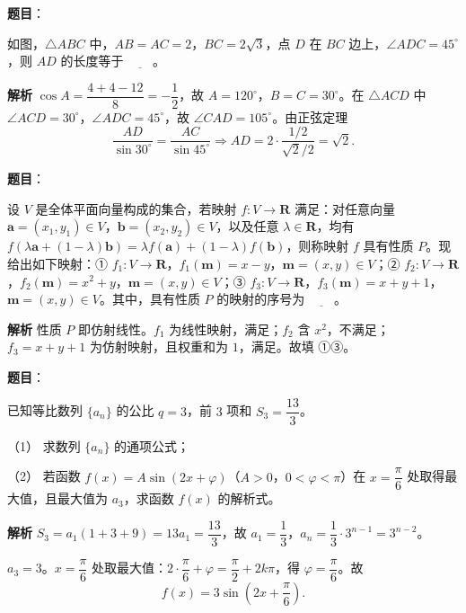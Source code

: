 \begin{answer}

\textbf{题目}：

如图，$\triangle ABC$ 中，$AB=AC=2$，$BC=2\sqrt3$，点 $D$ 在 $BC$ 边上，$\angle ADC=45^\circ$，则 $AD$ 的长度等于 $\underline{\qquad}$。
\nopagebreak[4]
\begin{center}\end{center}
\nopagebreak[4]
\textbf{解析}
$\cos A=\dfrac{4+4-12}{8}=-\dfrac12$，故 $A=120^\circ$，$B=C=30^\circ$。在 $\triangle ACD$ 中 $\angle ACD=30^\circ$，$\angle ADC=45^\circ$，故 $\angle CAD=105^\circ$。由正弦定理
\nopagebreak[4]
\[\frac{AD}{\sin30^\circ}=\frac{AC}{\sin45^\circ}\Longrightarrow AD=2\cdot\frac{1/2}{\sqrt2/2}=\sqrt2.\]


\end{answer}
\begin{answer}

\textbf{题目}：

设 $V$ 是全体平面向量构成的集合，若映射 $f:V\to\mathbf R$ 满足：对任意向量 $\boldsymbol a=(x_1,y_1)\in V$，$\boldsymbol b=(x_2,y_2)\in V$，以及任意 $\lambda\in\mathbf R$，均有 $f(\lambda\boldsymbol a+(1-\lambda)\boldsymbol b)=\lambda f(\boldsymbol a)+(1-\lambda)f(\boldsymbol b)$，则称映射 $f$ 具有性质 $P$。现给出如下映射：① $f_1:V\to\mathbf R$，$f_1(\boldsymbol m)=x-y$，$\boldsymbol m=(x,y)\in V$；② $f_2:V\to\mathbf R$，$f_2(\boldsymbol m)=x^2+y$，$\boldsymbol m=(x,y)\in V$；③ $f_3:V\to\mathbf R$，$f_3(\boldsymbol m)=x+y+1$，$\boldsymbol m=(x,y)\in V$。其中，具有性质 $P$ 的映射的序号为 $\underline{\qquad}$。

\textbf{解析}
性质 $P$ 即仿射线性。$f_1$ 为线性映射，满足；$f_2$ 含 $x^2$，不满足；$f_3=x+y+1$ 为仿射映射，且权重和为 $1$，满足。故填 ①③。


\end{answer}
\begin{answer}

\textbf{题目}：

已知等比数列 $\{a_n\}$ 的公比 $q=3$，前 $3$ 项和 $S_3=\dfrac{13}3$。

（1） 求数列 $\{a_n\}$ 的通项公式；

（2） 若函数 $f(x)=A\sin(2x+\varphi)$（$A>0$，$0<\varphi<\pi$）在 $x=\dfrac\pi6$ 处取得最大值，且最大值为 $a_3$，求函数 $f(x)$ 的解析式。

\textbf{解析}
$S_3=a_1(1+3+9)=13a_1=\dfrac{13}3$，故 $a_1=\dfrac13$，$a_n=\dfrac13\cdot3^{n-1}=3^{n-2}$。

$a_3=3$。$x=\dfrac\pi6$ 处取最大值：$2\cdot\dfrac\pi6+\varphi=\dfrac\pi2+2k\pi$，得 $\varphi=\dfrac\pi6$。故
\nopagebreak[4]
\[f(x)=3\sin\left(2x+\frac\pi6\right).\]



\end{answer}
